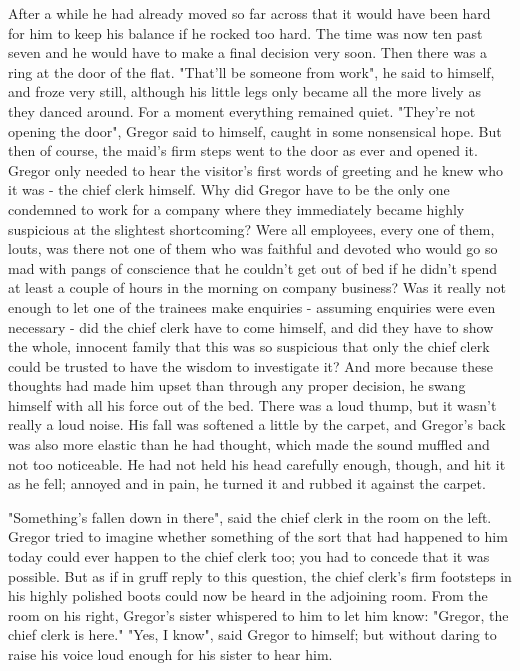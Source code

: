 After a while he had already moved so far across that it would have been hard for him to keep his balance if he rocked too hard. The time was now ten past seven and he would have to make a final decision very soon. Then there was a ring at the door of the flat. "That'll be someone from work", he said to himself, and froze very still, although his little legs only became all the more lively as they danced around. For a moment everything remained quiet. "They're not opening the door", Gregor said to himself, caught in some nonsensical hope. But then of course, the maid's firm steps went to the door as ever and opened it. Gregor only needed to hear the visitor's first words of greeting and he knew who it was - the chief clerk himself. Why did Gregor have to be the only one condemned to work for a company where they immediately became highly suspicious at the slightest shortcoming? Were all employees, every one of them, louts, was there not one of them who was faithful and devoted who would go so mad with pangs of conscience that he couldn't get out of bed if he didn't spend at least a couple of hours in the morning on company business? Was it really not enough to let one of the trainees make enquiries - assuming enquiries were even necessary - did the chief clerk have to come himself, and did they have to show the whole, innocent family that this was so suspicious that only the chief clerk could be trusted to have the wisdom to investigate it? And more because these thoughts had made him upset than through any proper decision, he swang himself with all his force out of the bed. There was a loud thump, but it wasn't really a loud noise. His fall was softened a little by the carpet, and Gregor's back was also more elastic than he had thought, which made the sound muffled and not too noticeable. He had not held his head carefully enough, though, and hit it as he fell; annoyed and in pain, he turned it and rubbed it against the carpet.

"Something's fallen down in there", said the chief clerk in the room on the left. Gregor tried to imagine whether something of the sort that had happened to him today could ever happen to the chief clerk too; you had to concede that it was possible. But as if in gruff reply to this question, the chief clerk's firm footsteps in his highly polished boots could now be heard in the adjoining room. From the room on his right, Gregor's sister whispered to him to let him know: "Gregor, the chief clerk is here." "Yes, I know", said Gregor to himself; but without daring to raise his voice loud enough for his sister to hear him.

